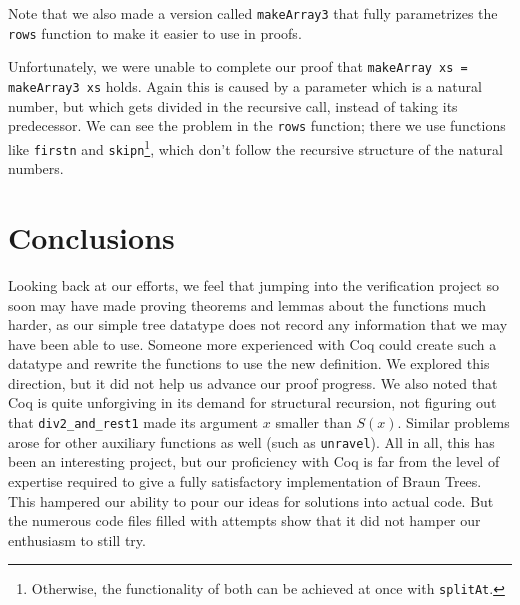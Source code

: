 \documentclass[a4paper,10pt]{article}
\begin{document}
Note that we also made a version called  \texttt{makeArray3} that fully parametrizes the \texttt{rows} function to make it easier to use in proofs.

Unfortunately, we were unable to complete our proof that \texttt{makeArray xs = makeArray3 xs} holds. Again this is caused by a parameter which is 
a natural number, but which gets divided in the recursive call, instead of taking its predecessor. We can see the problem in the \texttt{rows} function;
there we use functions like \texttt{firstn} and \texttt{skipn}\footnote{Otherwise, the functionality of both can be achieved at once with \texttt{splitAt}.}, 
which don't follow the recursive structure of the natural numbers.

\section{Conclusions}\label{conclusions}
Looking back at our efforts, we feel that jumping into the verification project so soon may have made proving theorems and lemmas about the functions much harder, as our simple tree datatype does not record any information that we may have been able to use.
Someone more experienced with Coq could create such a datatype and rewrite the functions to use the new definition. We explored this direction, but it did not help us advance our proof progress.
We also noted that Coq is quite unforgiving in its demand for structural recursion, not figuring out that \texttt{div2\_and\_rest1} made its argument $x$ smaller than $S(x)$. Similar problems arose for other auxiliary functions as well (such as \texttt{unravel}).
All in all, this has been an interesting project, but our proficiency with Coq is far from the level of expertise required to give a fully satisfactory implementation of Braun Trees. This hampered our ability to pour our ideas for solutions into actual code. But the numerous code files filled with attempts show that it did not hamper our enthusiasm to still try.



\end{document}
